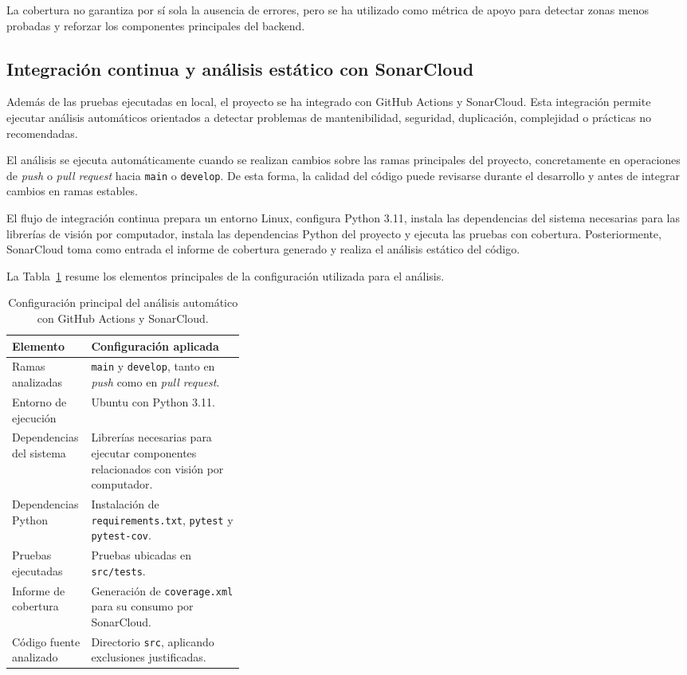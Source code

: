 La cobertura no garantiza por sí sola la ausencia de errores, pero se ha utilizado como métrica de apoyo para detectar zonas menos probadas y reforzar los componentes principales del backend.

\subsection{Integración continua y análisis estático con SonarCloud}

Además de las pruebas ejecutadas en local, el proyecto se ha integrado con GitHub Actions y SonarCloud. Esta integración permite ejecutar análisis automáticos orientados a detectar problemas de mantenibilidad, seguridad, duplicación, complejidad o prácticas no recomendadas.

El análisis se ejecuta automáticamente cuando se realizan cambios sobre las ramas principales del proyecto, concretamente en operaciones de \textit{push} o \textit{pull request} hacia \texttt{main} o \texttt{develop}. De esta forma, la calidad del código puede revisarse durante el desarrollo y antes de integrar cambios en ramas estables.

El flujo de integración continua prepara un entorno Linux, configura Python 3.11, instala las dependencias del sistema necesarias para las librerías de visión por computador, instala las dependencias Python del proyecto y ejecuta las pruebas con cobertura. Posteriormente, SonarCloud toma como entrada el informe de cobertura generado y realiza el análisis estático del código.

La Tabla~\ref{tabla:configuracion_sonarcloud} resume los elementos principales de la configuración utilizada para el análisis.

\begin{table}[H]
	\centering
	\small
	\renewcommand{\arraystretch}{1.12}
	\begin{tabularx}{\linewidth}{p{0.34\linewidth}X}
		\toprule
		\textbf{Elemento} & \textbf{Configuración aplicada} \\
		\midrule
		Ramas analizadas & \texttt{main} y \texttt{develop}, tanto en \textit{push} como en \textit{pull request}. \\
		Entorno de ejecución & Ubuntu con Python 3.11. \\
		Dependencias del sistema & Librerías necesarias para ejecutar componentes relacionados con visión por computador. \\
		Dependencias Python & Instalación de \texttt{requirements.txt}, \texttt{pytest} y \texttt{pytest-cov}. \\
		Pruebas ejecutadas & Pruebas ubicadas en \texttt{src/tests}. \\
		Informe de cobertura & Generación de \texttt{coverage.xml} para su consumo por SonarCloud. \\
		Código fuente analizado & Directorio \texttt{src}, aplicando exclusiones justificadas. \\
		\bottomrule
	\end{tabularx}
	\caption[Configuración del análisis con SonarCloud]{Configuración principal del análisis automático con GitHub Actions y SonarCloud.}
	\label{tabla:configuracion_sonarcloud}
\end{table}


